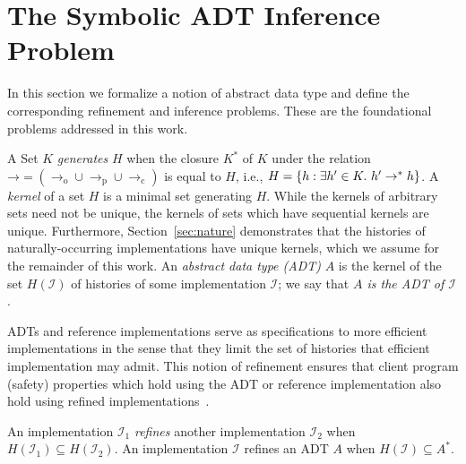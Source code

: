 \section{The Symbolic ADT Inference Problem}
\label{sec:inference}

In this section we formalize a notion of abstract data type and define the
corresponding refinement and inference problems. These are the foundational
problems addressed in this work.

A Set $K$ \emph{generates} $H$ when the closure $K^*$ of $K$ under the relation
$\mathord\to = (\to_\mathrm{o} \cup \to_\mathrm{p} \cup \to_\mathrm{c})$
is equal to $H$, i.e., $H = {\{{ h : \exists h' \in K.\ h' \to^\ast h }\}}$.
A \emph{kernel} of a set $H$ is a minimal set generating $H$. While the kernels
of arbitrary sets need not be unique, the kernels of sets which
have sequential kernels are unique. Furthermore, Section~\ref{sec:nature}
demonstrates that the histories of naturally-occurring implementations have
unique kernels, which we assume for the remainder of this work.
An \emph{abstract data type (ADT)} $A$ is the kernel of the set $H(\mathcal{I})$
of histories of some implementation $\mathcal{I}$; we say that \emph{$A$ is the
ADT of $\mathcal{I}$}.

ADTs and reference implementations serve as specifications to more efficient
implementations in the sense that they limit the set of histories that efficient
implementation may admit. This notion of refinement ensures that client program
(safety) properties which hold using the ADT or reference implementation also
hold using refined implementations~\cite{conf/popl/BouajjaniEEH15}.

\begin{definition}

  An implementation $\mathcal{I}_1$ \emph{refines} another implementation
  $\mathcal{I}_2$ when $H(\mathcal{I}_1) \subseteq H(\mathcal{I}_2)$. An
  implementation $\mathcal{I}$ refines an ADT $A$ when $H(\mathcal{I})
  \subseteq A^*$.

\end{definition}

